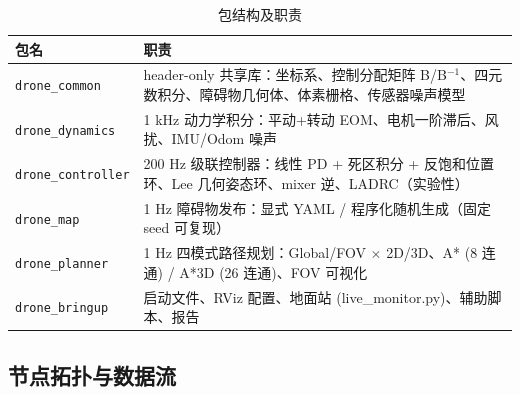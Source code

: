 \documentclass[12pt,a4paper]{article}
\newcommand{\pkg}[1]{\texttt{#1}}
\begin{document}
\begin{table}[H]
\centering
\caption{包结构及职责}
\label{tab:packages}
\small
\begin{tabularx}{\textwidth}{lX}
\toprule
\textbf{包名} & \textbf{职责} \\
\midrule
\pkg{drone\_common} & header-only 共享库：坐标系、控制分配矩阵 B/B$^{-1}$、四元数积分、障碍物几何体、体素栅格、传感器噪声模型 \\
\pkg{drone\_dynamics} & 1 kHz 动力学积分：平动+转动 EOM、电机一阶滞后、风扰、IMU/Odom 噪声 \\
\pkg{drone\_controller} & 200 Hz 级联控制器：线性 PD + 死区积分 + 反饱和位置环、Lee 几何姿态环、mixer 逆、LADRC（实验性）\\
\pkg{drone\_map} & 1 Hz 障碍物发布：显式 YAML / 程序化随机生成（固定 seed 可复现）\\
\pkg{drone\_planner} & 1 Hz 四模式路径规划：Global/FOV $\times$ 2D/3D、A* (8 连通) / A*3D (26 连通)、FOV 可视化 \\
\pkg{drone\_bringup} & 启动文件、RViz 配置、地面站 (live\_monitor.py)、辅助脚本、报告 \\
\bottomrule
\end{tabularx}
\end{table}

\subsection{节点拓扑与数据流}
\end{document}
